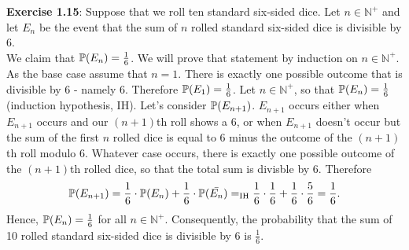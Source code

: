 \textbf{Exercise 1.15}: Suppose that we roll ten standard six-sided dice.
Let $n \in \mathbb{N}^+$ and let $E_n$ be the event that the sum of $n$ rolled
standard six-sided dice is divisible by 6. \\
We claim that $\mathbb{P}(E_n) = \frac{1}{6}$. We will prove that statement by induction
on $n \in \mathbb{N}^+$. As the base case assume that $n=1$. There is exactly one
possible outcome that is divisible by 6 - namely 6. Therefore $\mathbb{P}(E_1) = \frac{1}{6}$.
Let $n \in \mathbb{N}^+$, so that $\mathbb{P}(E_n) = \frac{1}{6}$ (induction hypothesis,
IH). Let's consider $\mathbb{P}(E_{n+1})$. $E_{n+1}$ occurs either when $E_{n+1}$ occurs
and our $(n+1)$th roll shows a 6, or when $E_{n+1}$ doesn't occur but the sum of
the first $n$ rolled dice is equal to 6 minus the outcome of the $(n+1)$th roll
modulo 6. Whatever case occurs, there is exactly one possible outcome of the
$(n+1)$th rolled dice, so that the total sum is divisble by 6. Therefore
\[
  \mathbb{P}(E_{n+1})
    = \frac{1}{6} \cdot \mathbb{P}(E_n) + \frac{1}{6} \cdot \mathbb{P}(\bar{E_n})
    =_{\text{IH}} \frac{1}{6} \cdot \frac{1}{6} + \frac{1}{6} \cdot \frac{5}{6}
    = \frac{1}{6}.
\]
Hence, $\mathbb{P}(E_n) = \frac{1}{6}$ for all $n \in \mathbb{N}^+$. Consequently, the
probability that the sum of 10 rolled standard six-sided dice is divisible by
6 is $\frac{1}{6}$.
\\[0.5cm]
